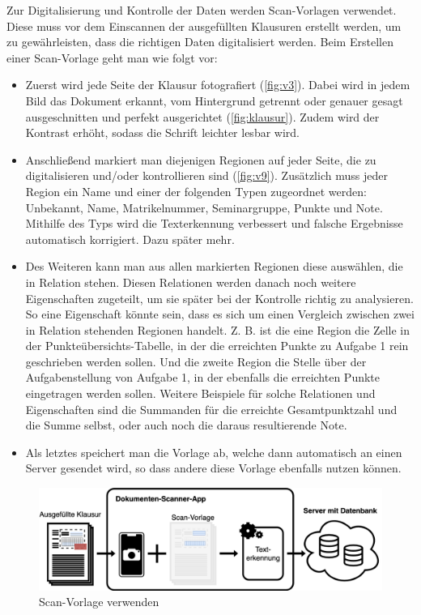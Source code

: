 \documentclass[nomenclature, oneside, 150]{HSMW-Thesis}
\begin{document}
	Zur Digitalisierung und Kontrolle der Daten werden Scan-Vorlagen verwendet. Diese muss vor dem Einscannen der ausgefüllten Klausuren erstellt werden, um zu gewährleisten, dass die richtigen Daten digitalisiert werden. Beim Erstellen einer Scan-Vorlage geht man wie folgt vor:
	\begin{itemize}
		\item Zuerst wird jede Seite der Klausur fotografiert (\ref{fig:v3}). Dabei wird in jedem Bild das Dokument erkannt, vom Hintergrund getrennt oder genauer gesagt ausgeschnitten und perfekt ausgerichtet (\ref{fig:klausur}). Zudem wird der Kontrast erhöht, sodass die Schrift leichter lesbar wird.
		
		\item Anschließend markiert man diejenigen Regionen auf jeder Seite, die zu digitalisieren und/oder kontrollieren sind (\ref{fig:v9}). Zusätzlich muss jeder Region ein Name und einer der folgenden Typen zugeordnet werden: Unbekannt, Name, Matrikelnummer, Seminargruppe, Punkte und Note. Mithilfe des Typs wird die Texterkennung verbessert und falsche Ergebnisse automatisch korrigiert. Dazu später mehr.
			
		\item Des Weiteren kann man aus allen markierten Regionen diese auswählen, die in Relation stehen. Diesen Relationen werden danach noch weitere Eigenschaften zugeteilt, um sie später bei der Kontrolle richtig zu analysieren. So eine Eigenschaft könnte sein, dass es sich um einen Vergleich zwischen zwei in Relation stehenden Regionen handelt. Z. B. ist die eine Region die Zelle in der Punkteübersichts-Tabelle, in der die erreichten Punkte zu Aufgabe 1 rein geschrieben werden sollen. Und die zweite Region die Stelle über der Aufgabenstellung von Aufgabe 1, in der ebenfalls die erreichten Punkte eingetragen werden sollen. Weitere Beispiele für solche Relationen und Eigenschaften sind die Summanden für die erreichte Gesamtpunktzahl und die Summe selbst, oder auch noch die daraus resultierende Note.
		
		\item Als letztes speichert man die Vorlage ab, welche dann automatisch an einen Server gesendet wird, so dass andere diese Vorlage ebenfalls nutzen können.
	\end{itemize}
	
	\begin{figure}[th]
    	\centering
    	\includegraphics[width=\textwidth]{img/schema2}
    	\caption{Scan-Vorlage verwenden}
    	\label{fig:schema2}
    \end{figure}
	
\end{document}
